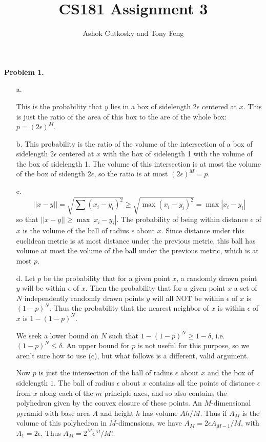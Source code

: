 \documentclass[12pt]{amsart}
\title{CS181 Assignment 3}
\author{Ashok Cutkosky and Tony Feng}
\theoremstyle{remark}
\begin{document}
\maketitle

\noindent \textbf{Problem 1.}
\begin{enumerate}

\item[a.]

This is the probability that $y$ lies in a box of sidelength $2\epsilon$ centered at $x$. This is just the ratio of the area of this box to the are of the whole box: $p=(2\epsilon)^M$.


\item[b.]
This probability is the ratio of the volume of the intersection of a box of sidelength $2\epsilon$ centered at $x$ with the box of sidelength 1 with the volume of the box of sidelength 1. The volume of this intersection is at most the volume of the box of sidength $2\epsilon$, so the ratio is at most $(2\epsilon)^M=p$.

\item[c.]
\[
||x-y||=\sqrt{\sum (x_i-y_i)^2}\ge \sqrt{\max (x_i-y_i)^2}=\max |x_i-y_i|
\]
so that $||x-y||\ge \max |x_i-y_i|$. The probability of being within distance $\epsilon$ of $x$ is the volume of the ball of radius $\epsilon$ about $x$. Since distance under this euclidean metric is at most distance under the previous metric, this ball has volume at most the volume of the ball under the previous metric, which is at most $p$.

\item[d.]
Let $p$ be the probability that for a given point $x$, a randomly drawn point $y$ will be within $\epsilon$ of $x$. Then the probability that for a given point $x$ a set of $N$ independently randomly drawn points $y$ will all NOT be within $\epsilon$ of $x$ is $(1-p)^N$. Thus the probability that the nearest neighbor of $x$ is within $\epsilon$ of $x$ is $1-(1-p)^N$.

We seek a lower bound on $N$ such that $1-(1-p)^N \geq 1-\delta$, i.e. $(1-p)^N \leq \delta$. An upper bound for $p$ is not useful for this purpose, so we aren't sure how to use (c), but what follows is a different, valid argument. 

Now $p$ is just the intersection of the ball of radius $\epsilon$ about $x$ and the box of sidelength $1$. The ball of radius $\epsilon$ about $x$ contains all the points of distance $\epsilon$ from $x$ along each of the $m$ principle axes, and so also contains the polyhedron given by the convex closure of these points. An $M$-dimensional pyramid with base area $A$ and height $h$ has volume $Ah/M$. Thus if $A_M$ is the volume of this polyhedron in $M$-dimensions, we have $A_M=2\epsilon A_{M-1}/M$, with $A_1=2\epsilon$. Thus $A_M=2^M\epsilon^M/M!$.


\end{enumerate}
\end{document}
